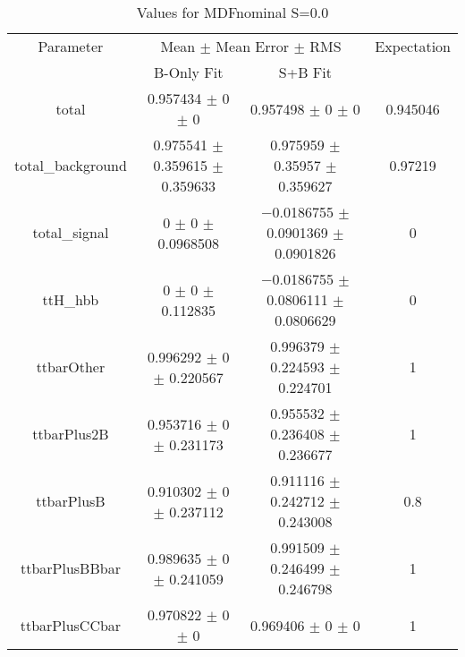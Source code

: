 \begin{table}
\centering
\caption{Values for MDFnominal S=0.0}
\begin{tabular}{cccc}
\toprule
Parameter & \multicolumn{2}{c}{Mean $\pm$ Mean Error $\pm$ RMS} & Expectation\\
 & B-Only Fit & S+B Fit & \\
\midrule
total & \num{0.957434} $\pm$ \num{0} $\pm$ \num{0} & \num{0.957498} $\pm$ \num{0} $\pm$ \num{0} & \num{0.945046}\\
total\_background & \num{0.975541} $\pm$ \num{0.359615} $\pm$ \num{0.359633} & \num{0.975959} $\pm$ \num{0.35957} $\pm$ \num{0.359627} & \num{0.97219}\\
total\_signal & \num{0} $\pm$ \num{0} $\pm$ \num{0.0968508} & \num{-0.0186755} $\pm$ \num{0.0901369} $\pm$ \num{0.0901826} & \num{0}\\
ttH\_hbb & \num{0} $\pm$ \num{0} $\pm$ \num{0.112835} & \num{-0.0186755} $\pm$ \num{0.0806111} $\pm$ \num{0.0806629} & \num{0}\\
ttbarOther & \num{0.996292} $\pm$ \num{0} $\pm$ \num{0.220567} & \num{0.996379} $\pm$ \num{0.224593} $\pm$ \num{0.224701} & \num{1}\\
ttbarPlus2B & \num{0.953716} $\pm$ \num{0} $\pm$ \num{0.231173} & \num{0.955532} $\pm$ \num{0.236408} $\pm$ \num{0.236677} & \num{1}\\
ttbarPlusB & \num{0.910302} $\pm$ \num{0} $\pm$ \num{0.237112} & \num{0.911116} $\pm$ \num{0.242712} $\pm$ \num{0.243008} & \num{0.8}\\
ttbarPlusBBbar & \num{0.989635} $\pm$ \num{0} $\pm$ \num{0.241059} & \num{0.991509} $\pm$ \num{0.246499} $\pm$ \num{0.246798} & \num{1}\\
ttbarPlusCCbar & \num{0.970822} $\pm$ \num{0} $\pm$ \num{0} & \num{0.969406} $\pm$ \num{0} $\pm$ \num{0} & \num{1}\\
\bottomrule
\end{tabular}
\end{table}